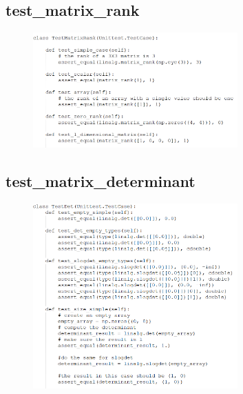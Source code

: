 \subsection{test\_matrix\_rank}	
\begin{figure}[h]
	\centering
	\includegraphics[width=0.70\textwidth]{snippets/rank/1.png}
\end{figure}

\subsection{test\_matrix\_determinant}	
\begin{figure}[h]
	\centering
	\includegraphics[width=0.70\textwidth]{snippets/Det/1.png}
\end{figure}


